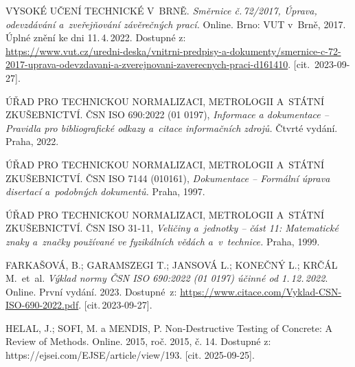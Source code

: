 

\begin{thebibliography}{99}
	
	VYSOKÉ UČENÍ TECHNICKÉ V~BRNĚ.
	\emph{Směrnice č.\,72/2017, Úprava, odevzdávání a~zveřejňování závěrečných prací.}
	Online. Brno: VUT v~Brně, 2017.
	Úplné znění ke dni 11.\,4.\,2022.
	Dostupné z:\\
	{\small
	\url{https://www.vut.cz/uredni-deska/vnitrni-predpisy-a-dokumenty/smernice-c-72-2017-uprava-odevzdavani-a-zverejnovani-zaverecnych-praci-d161410}.}
	[cit.\ 2023-09-27].

    ÚŘAD PRO TECHNICKOU NORMALIZACI, METROLOGII A~STÁTNÍ ZKUŠEBNICTVÍ.
    ČSN ISO 690:2022 (01 0197), \emph{Informace a dokumentace -- Pravidla pro bibliografické odkazy a~citace informačních zdrojů.}
    Čtvrté vydání. Praha, 2022.

    ÚŘAD PRO TECHNICKOU NORMALIZACI, METROLOGII A~STÁTNÍ ZKUŠEBNICTVÍ.
    ČSN ISO 7144 (010161), \emph{Dokumentace -- Formální úprava disertací a~podobných dokumentů.}
    Praha, 1997.

    ÚŘAD PRO TECHNICKOU NORMALIZACI, METROLOGII A~STÁTNÍ ZKUŠEBNICTVÍ.
    ČSN ISO 31-11, \emph{Veličiny a~jednotky -- část 11: Matematické znaky a~značky používané ve fyzikálních vědách a~v~technice.}
    Praha, 1999.

	FARKAŠOVÁ, B.; GARAMSZEGI T.; JANSOVÁ L.; KONEČNÝ L.; KRČÁL M.\ et~al.
	\emph{Výklad normy ČSN ISO 690:2022 (01 0197) účinné od 1.\,12.\,2022}.
	 Online. První vydání. 2023.
	Dostupné~z:
	\url{https://www.citace.com/Vyklad-CSN-ISO-690-2022.pdf}.
	[cit.\,2023-09-27].



    HELAL, J.; SOFI, M. a MENDIS, P. Non-Destructive Testing of Concrete: A Review of Methods. Online. 2015, roč. 2015, č. 14. Dostupné z: https://ejsei.com/EJSE/article/view/193. [cit. 2025-09-25].
\end{thebibliography}


%
%
%
